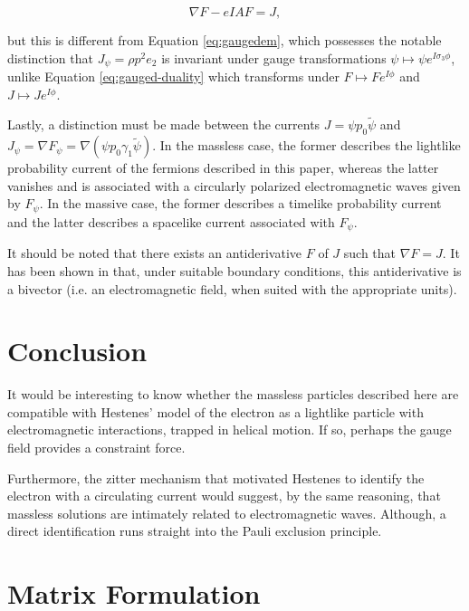 \documentclass{article}
\begin{document}
    \begin{equation}
      \nabla F - e I A F = J,\label{eq:gauged-duality}
    \end{equation}

    but this is different from Equation \ref{eq:gaugedem}, which possesses the notable distinction that $J_\psi = \rho p^2 e_2$ is invariant under gauge transformations $\psi \mapsto \psi e^{I \sigma_3 \phi}$, unlike Equation \ref{eq:gauged-duality} which transforms under $F \mapsto F e^{I \phi}$ and $J \mapsto J e^{I \phi}$.

  Lastly, a distinction must be made between the currents $J = \psi p_0 \widetilde \psi$ and $J_\psi = \nabla F_\psi = \nabla (\psi p_0 \gamma_1 \widetilde \psi)$. In the massless case, the former describes the lightlike probability current of the fermions described in this paper, whereas the latter vanishes and is associated with a circularly polarized electromagnetic waves given by $F_\psi$. In the massive case, the former describes a timelike probability current and the latter describes a spacelike current associated with $F_\psi$. 

  It should be noted that there exists an antiderivative $F$ of $J$ such that $\nabla F = J$. It has been shown in \cite{continuity-equation} that, under suitable boundary conditions, this antiderivative is a bivector (i.e. an electromagnetic field, when suited with the appropriate units).

  \section{Conclusion}

  It would be interesting to know whether the massless particles described here are compatible with Hestenes' model of the electron as a lightlike particle with electromagnetic interactions, trapped in helical motion.\cite{zitter} If so, perhaps the gauge field provides a constraint force.

  Furthermore, the zitter mechanism that motivated Hestenes to identify the electron with a circulating current would suggest, by the same reasoning, that massless solutions are intimately related to electromagnetic waves. Although, a direct identification runs straight into the Pauli exclusion principle.

  \newpage

  \appendix

  \section{Matrix Formulation} \label{matrix}
\end{document}
